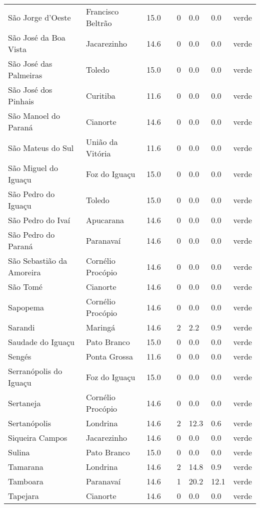 \begin{longtable}{l|lllllll}
  São Jorge d'Oeste & Francisco Beltrão & 15.0 &  & 0 & 0.0 & 0.0 & verde \\ 
  São José da Boa Vista & Jacarezinho & 14.6 &  & 0 & 0.0 & 0.0 & verde \\ 
  São José das Palmeiras & Toledo & 15.0 &  & 0 & 0.0 & 0.0 & verde \\ 
  São José dos Pinhais & Curitiba & 11.6 &  & 0 & 0.0 & 0.0 & verde \\ 
  São Manoel do Paraná & Cianorte & 14.6 &  & 0 & 0.0 & 0.0 & verde \\ 
  São Mateus do Sul & União da Vitória & 11.6 &  & 0 & 0.0 & 0.0 & verde \\ 
  São Miguel do Iguaçu & Foz do Iguaçu & 15.0 &  & 0 & 0.0 & 0.0 & verde \\ 
  São Pedro do Iguaçu & Toledo & 15.0 &  & 0 & 0.0 & 0.0 & verde \\ 
  São Pedro do Ivaí & Apucarana & 14.6 &  & 0 & 0.0 & 0.0 & verde \\ 
  São Pedro do Paraná & Paranavaí & 14.6 &  & 0 & 0.0 & 0.0 & verde \\ 
  São Sebastião da Amoreira & Cornélio Procópio & 14.6 &  & 0 & 0.0 & 0.0 & verde \\ 
  São Tomé & Cianorte & 14.6 &  & 0 & 0.0 & 0.0 & verde \\ 
  Sapopema & Cornélio Procópio & 14.6 &  & 0 & 0.0 & 0.0 & verde \\ 
  Sarandi & Maringá & 14.6 &  & 2 & 2.2 & 0.9 & verde \\ 
  Saudade do Iguaçu & Pato Branco & 15.0 &  & 0 & 0.0 & 0.0 & verde \\ 
  Sengés & Ponta Grossa & 11.6 &  & 0 & 0.0 & 0.0 & verde \\ 
  Serranópolis do Iguaçu & Foz do Iguaçu & 15.0 &  & 0 & 0.0 & 0.0 & verde \\ 
  Sertaneja & Cornélio Procópio & 14.6 &  & 0 & 0.0 & 0.0 & verde \\ 
  Sertanópolis & Londrina & 14.6 &  & 2 & 12.3 & 0.6 & verde \\ 
  Siqueira Campos & Jacarezinho & 14.6 &  & 0 & 0.0 & 0.0 & verde \\ 
  Sulina & Pato Branco & 15.0 &  & 0 & 0.0 & 0.0 & verde \\ 
  Tamarana & Londrina & 14.6 &  & 2 & 14.8 & 0.9 & verde \\ 
  Tamboara & Paranavaí & 14.6 &  & 1 & 20.2 & 12.1 & verde \\ 
  Tapejara & Cianorte & 14.6 &  & 0 & 0.0 & 0.0 & verde \\ 

\end{longtable}
